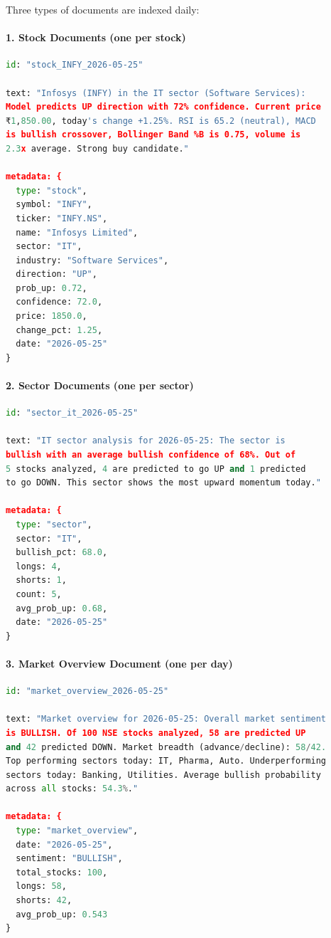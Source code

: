 \documentclass[11pt,a4paper]{article}
\begin{document}
Three types of documents are indexed daily:

\paragraph{1. Stock Documents (one per stock)}

\begin{lstlisting}[language=Python, caption=Stock Document Example]
id: "stock_INFY_2026-05-25"

text: "Infosys (INFY) in the IT sector (Software Services):
Model predicts UP direction with 72% confidence. Current price
₹1,850.00, today's change +1.25%. RSI is 65.2 (neutral), MACD
is bullish crossover, Bollinger Band %B is 0.75, volume is
2.3x average. Strong buy candidate."

metadata: {
  type: "stock",
  symbol: "INFY",
  ticker: "INFY.NS",
  name: "Infosys Limited",
  sector: "IT",
  industry: "Software Services",
  direction: "UP",
  prob_up: 0.72,
  confidence: 72.0,
  price: 1850.0,
  change_pct: 1.25,
  date: "2026-05-25"
}
\end{lstlisting}

\paragraph{2. Sector Documents (one per sector)}

\begin{lstlisting}[language=Python, caption=Sector Document Example]
id: "sector_it_2026-05-25"

text: "IT sector analysis for 2026-05-25: The sector is
bullish with an average bullish confidence of 68%. Out of
5 stocks analyzed, 4 are predicted to go UP and 1 predicted
to go DOWN. This sector shows the most upward momentum today."

metadata: {
  type: "sector",
  sector: "IT",
  bullish_pct: 68.0,
  longs: 4,
  shorts: 1,
  count: 5,
  avg_prob_up: 0.68,
  date: "2026-05-25"
}
\end{lstlisting}

\paragraph{3. Market Overview Document (one per day)}

\begin{lstlisting}[language=Python, caption=Market Document Example]
id: "market_overview_2026-05-25"

text: "Market overview for 2026-05-25: Overall market sentiment
is BULLISH. Of 100 NSE stocks analyzed, 58 are predicted UP
and 42 predicted DOWN. Market breadth (advance/decline): 58/42.
Top performing sectors today: IT, Pharma, Auto. Underperforming
sectors today: Banking, Utilities. Average bullish probability
across all stocks: 54.3%."

metadata: {
  type: "market_overview",
  date: "2026-05-25",
  sentiment: "BULLISH",
  total_stocks: 100,
  longs: 58,
  shorts: 42,
  avg_prob_up: 0.543
}
\end{lstlisting}
\end{document}
